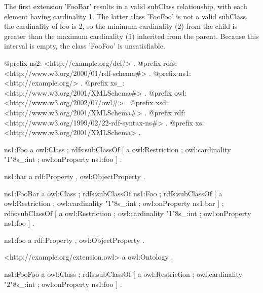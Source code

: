 The first extension 'FooBar' results in a valid subClass relationship, with each element having cardinality 1. The latter class 'FooFoo' is not a valid subClass, the cardinality of foo is 2, so the minimum cardinality (2) from the child is greater than the maximum cardinality (1) inherited from the parent. Because this interval is empty, the class 'FooFoo' is unsatisfiable.


\begin{DoxyCodeInclude}
@prefix ns2:     <http://example.org/def/> .
@prefix rdfs:    <http://www.w3.org/2000/01/rdf-schema#> .
@prefix ns1:     <http://example.org/> .
@prefix xs_:     <http://www.w3.org/2001/XMLSchema#> .
@prefix owl:     <http://www.w3.org/2002/07/owl#> .
@prefix xsd:     <http://www.w3.org/2001/XMLSchema#> .
@prefix rdf:     <http://www.w3.org/1999/02/22-rdf-syntax-ns#> .
@prefix xs:      <http://www.w3.org/2001/XMLSchema> .

ns1:Foo
      a       owl:Class ;
      rdfs:subClassOf
              [ a       owl:Restriction ;
                owl:cardinality "1"^^xs_:int ;
                owl:onProperty ns1:foo
              ] .

ns1:bar
      a       rdf:Property , owl:ObjectProperty .

ns1:FooBar
      a       owl:Class ;
      rdfs:subClassOf ns1:Foo ;
      rdfs:subClassOf
              [ a       owl:Restriction ;
                owl:cardinality "1"^^xs_:int ;
                owl:onProperty ns1:bar
              ] ;
      rdfs:subClassOf
              [ a       owl:Restriction ;
                owl:cardinality "1"^^xs_:int ;
                owl:onProperty ns1:foo
              ] .

ns1:foo
      a       rdf:Property , owl:ObjectProperty .

<http://example.org/extension.owl>
      a       owl:Ontology .

ns1:FooFoo
      a       owl:Class ;
      rdfs:subClassOf
              [ a       owl:Restriction ;
                owl:cardinality "2"^^xs_:int ;
                owl:onProperty ns1:foo
              ] .
\end{DoxyCodeInclude}


